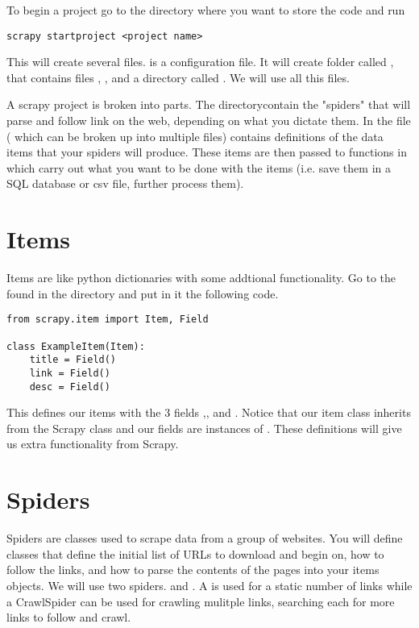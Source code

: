 To begin a project go to the directory where you want to store the code and run
\begin{lstlisting}
scrapy startproject <project name>
\end{lstlisting}
This will create several files.  is a configuration file. It will create folder called  , that contains files , ,  and a directory called . We will use all this files.

A scrapy project is broken into parts. The  directorycontain the "spiders" that will parse and follow link on the web, depending on what you dictate them. In the  file ( which can be broken up into multiple files) contains definitions of the data items that your spiders will produce. These items are then passed to functions in  which carry out what you want to be done with the items (i.e. save them in a SQL database or csv file, further process them).

\section*{Items}
Items are like python dictionaries with some addtional functionality. Go to the  found in the  directory
and put in it the following code.
\begin{lstlisting}
from scrapy.item import Item, Field

class ExampleItem(Item):
    title = Field()
    link = Field()
    desc = Field()
\end{lstlisting}

This defines our items with the 3 fields ,, and . Notice that our item class inherits from the Scrapy class  and our fields are instances of . These definitions will give us extra functionality from Scrapy.

\section*{Spiders}
Spiders are classes used to scrape data from a group of websites. You will define classes that define the initial list of URLs to download and begin on, how to follow the links, and how to parse the contents of the pages into your items objects. We will use two spiders.  and . A  is used for a static number of links while a CrawlSpider can be used for crawling mulitple links, searching each for more links to follow and crawl.

